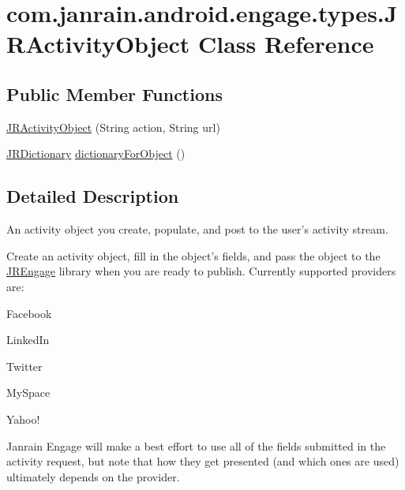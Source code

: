 \hypertarget{classcom_1_1janrain_1_1android_1_1engage_1_1types_1_1_j_r_activity_object}{
\section{com.janrain.android.engage.types.JRActivityObject Class Reference}
\label{classcom_1_1janrain_1_1android_1_1engage_1_1types_1_1_j_r_activity_object}
}
\subsection*{Public Member Functions}
\begin{DoxyCompactItemize}
\item 
\hyperlink{classcom_1_1janrain_1_1android_1_1engage_1_1types_1_1_j_r_activity_object_a625c1c83258dc53f0f5c5531c79db3b9}{JRActivityObject} (String action, String url)
\item 
\hyperlink{classcom_1_1janrain_1_1android_1_1engage_1_1types_1_1_j_r_dictionary}{JRDictionary} \hyperlink{classcom_1_1janrain_1_1android_1_1engage_1_1types_1_1_j_r_activity_object_a9cfd26c57e878a8e12736c39103741a0}{dictionaryForObject} ()
\end{DoxyCompactItemize}


\subsection{Detailed Description}
An activity object you create, populate, and post to the user's activity stream.

Create an activity object, fill in the object's fields, and pass the object to the \hyperlink{classcom_1_1janrain_1_1android_1_1engage_1_1_j_r_engage}{JREngage} library when you are ready to publish. Currently supported providers are:
\begin{DoxyItemize}
\item Facebook
\item LinkedIn
\item Twitter
\item MySpace
\item Yahoo!
\end{DoxyItemize}

Janrain Engage will make a best effort to use all of the fields submitted in the activity request, but note that how they get presented (and which ones are used) ultimately depends on the provider.

